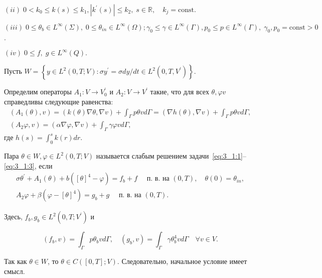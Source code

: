 $(ii)\;0<k_{0} \leq k(s) \leq k_{1},\left|k^{\prime}(s)\right| \leq k_{2},\; s \in \mathbb{R},
\quad k_{j} = \text{const}.$

$(iii)\; 0 \leq \theta_{b} \in L^{\infty}(\Sigma),\; 0 \leq \theta_{i n} \in L^{\infty}(\Omega);
\gamma_{0} \leq \gamma \in L^{\infty}(\Gamma),
p_{0} \leq p \in L^{\infty}(\Gamma),\; \gamma_{0}, p_{0}= \text{const} >0$.

$(iv)\; 0 \leq f,\; g \in L^{\infty}(Q).$

Пусть
$
W=\left\{y \in L^{2}(0, T ; V): \sigma y^{\prime}=\sigma d y / d t
\in L^{2}\left(0, T, V^{\prime}\right)\right\}.
$

Определим операторы $A_{1}: V \rightarrow V_{0}^{\prime}$ и $A_{2}: V \rightarrow V^{\prime}$ такие,
что для всех $\theta, \varphi v$ справедливы следующие равенства:
\[
    \begin{gathered}
        \left(A_{1}(\theta), v\right)=(k(\theta) \nabla \theta, \nabla v)
        +\int_{\Gamma} p \theta v d \Gamma=(\nabla h(\theta), \nabla v)+\int_{\Gamma} p \theta v d \Gamma, \\
        \left(A_{2} \varphi, v\right)=(\alpha \nabla \varphi, \nabla v)
        +\int_{\Gamma} \gamma \varphi v d \Gamma,
    \end{gathered}
\]
где $h(s)=\int_{0}^{s} k(r) d r$.

\begin{definition}
    Пара $\theta \in W, \varphi \in L^{2}(0, T ; V)$ называется слабым решением
    задачи~\eqref{eq:3_1:1}--\eqref{eq:3_1:3}, если
    \begin{gather}
        \sigma \theta^{\prime}+A_{1}(\theta)
        +b\left([\theta]^{4}-\varphi\right)=f_{b}+f
        \quad \text { п. в. на }(0, T),
        \quad \theta(0)=\theta_{i n}, \label{eq:3_1:4}\\
        A_{2} \varphi+\beta\left(\varphi-[\theta]^{4}\right)=
        g_{b}+g \quad \text { п. в. на }(0, T). \label{eq:3_1:5}
    \end{gather}
\end{definition}

Здесь, $f_{b}, g_{b} \in L^{2}\left(0, T ; V^{\prime}\right)$ и

\[
    \left(f_{b}, v\right)=\int_{\Gamma} p \theta_{b} v d \Gamma,
    \quad\left(g_{b}, v\right)=\int_{\Gamma} \gamma \theta_{b}^{4} v d \Gamma \quad \forall v \in V.
\]

\begin{remark}
    Так как $\theta \in W$, то $\theta \in C([0, T] ; V)$.
    Следовательно, начальное условие имеет смысл.
\end{remark}

